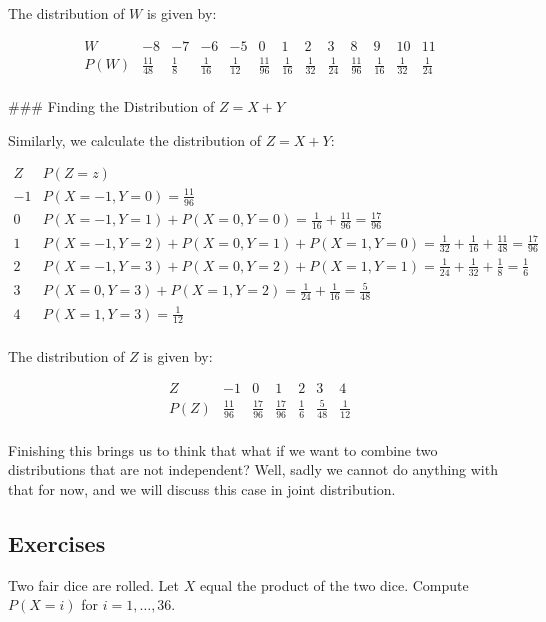 \begin{example}
\begin{solution}
The distribution of \(W\) is given by:

\[
\begin{array}{c|cccccccccccc}
W & -8 & -7 & -6 & -5 & 0 & 1 & 2 & 3 & 8 & 9 & 10 & 11 \\
\hline
P(W) & \frac{11}{48} & \frac{1}{8} & \frac{1}{16} & \frac{1}{12} & \frac{11}{96} & \frac{1}{16} & \frac{1}{32} & \frac{1}{24} & \frac{11}{96} & \frac{1}{16} & \frac{1}{32} & \frac{1}{24} \\
\end{array}
\]

### Finding the Distribution of \(Z = X + Y\)

Similarly, we calculate the distribution of \(Z = X + Y\):

\[
\begin{array}{c|c}
Z & P(Z = z) \\
\hline
-1 & P(X = -1, Y = 0) = \frac{11}{96} \\
0 & P(X = -1, Y = 1) + P(X = 0, Y = 0) = \frac{1}{16} + \frac{11}{96} = \frac{17}{96} \\
1 & P(X = -1, Y = 2) + P(X = 0, Y = 1) + P(X = 1, Y = 0) = \frac{1}{32} + \frac{1}{16} + \frac{11}{48} = \frac{17}{96} \\
2 & P(X = -1, Y = 3) + P(X = 0, Y = 2) + P(X = 1, Y = 1) = \frac{1}{24} + \frac{1}{32} + \frac{1}{8} = \frac{1}{6} \\
3 & P(X = 0, Y = 3) + P(X = 1, Y = 2) = \frac{1}{24} + \frac{1}{16} = \frac{5}{48} \\
4 & P(X = 1, Y = 3) = \frac{1}{12} \\
\end{array}
\]

The distribution of \(Z\) is given by:

\[
\begin{array}{c|cccccc}
Z & -1 & 0 & 1 & 2 & 3 & 4 \\
\hline
P(Z) & \frac{11}{96} & \frac{17}{96} & \frac{17}{96} & \frac{1}{6} & \frac{5}{48} & \frac{1}{12} \\
\end{array}
\]

\end{solution}
\end{example}

Finishing this brings us to think that what if we want to combine two distributions that are not independent? Well, sadly we cannot do anything with that for now, and we will discuss this case in joint distribution.

\subsection{Exercises}
\begin{exercise}
Two fair dice are rolled. Let \(X\) equal the product of the two dice. Compute \(P(X = i)\) for \(i = 1, \ldots, 36\).
\end{exercise}

